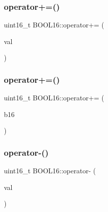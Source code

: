 \hypertarget{struct_b_o_o_l16_a6b2a394d85747eaf07bc1714044f58c3}{}\label{struct_b_o_o_l16_a6b2a394d85747eaf07bc1714044f58c3} 
\subsubsection{\texorpdfstring{operator+=()}{operator+=()}\hspace{0.1cm}{\footnotesize\ttfamily [1/2]}}
{\footnotesize\ttfamily uint16\+\_\+t B\+O\+O\+L16\+::operator+= (\begin{DoxyParamCaption}\item[{const uint16\+\_\+t}]{val }\end{DoxyParamCaption})\hspace{0.3cm}{\ttfamily [inline]}}

\hypertarget{struct_b_o_o_l16_a7d60f0d408ef0d054697ba07a364a155}{}\label{struct_b_o_o_l16_a7d60f0d408ef0d054697ba07a364a155} 
\subsubsection{\texorpdfstring{operator+=()}{operator+=()}\hspace{0.1cm}{\footnotesize\ttfamily [2/2]}}
{\footnotesize\ttfamily uint16\+\_\+t B\+O\+O\+L16\+::operator+= (\begin{DoxyParamCaption}\item[{const \hyperlink{struct_b_o_o_l16}{B\+O\+O\+L16}}]{b16 }\end{DoxyParamCaption})\hspace{0.3cm}{\ttfamily [inline]}}

\hypertarget{struct_b_o_o_l16_a5aec2aa08b16b10f49fa019b9d3138e3}{}\label{struct_b_o_o_l16_a5aec2aa08b16b10f49fa019b9d3138e3} 
\subsubsection{\texorpdfstring{operator-\/()}{operator-()}\hspace{0.1cm}{\footnotesize\ttfamily [1/2]}}
{\footnotesize\ttfamily uint16\+\_\+t B\+O\+O\+L16\+::operator-\/ (\begin{DoxyParamCaption}\item[{const uint16\+\_\+t}]{val }\end{DoxyParamCaption})\hspace{0.3cm}{\ttfamily [inline]}}

